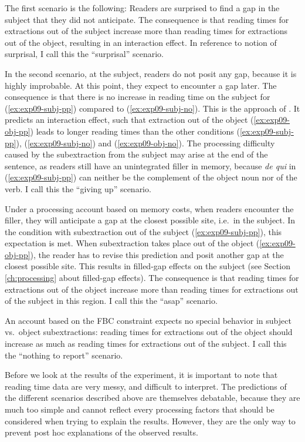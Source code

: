 The first scenario is the following: Readers are surprised to find a gap in the subject that they did not anticipate. The consequence is that reading times for extractions out of the subject increase more than reading times for extractions out of the object, resulting in an interaction effect. In reference to  notion of surprisal, I call this the ``surprisal'' scenario.

In the second scenario, at the subject, readers do not posit any gap, because it is highly improbable. At this point, they expect to encounter a gap later. The consequence is that there is no increase in reading time on the subject for (\ref{ex:exp09-subj-pp}) compared to (\ref{ex:exp09-subj-no}). This is the approach of \citet{Yoshida.2014}. It predicts an interaction effect, such that extraction out of the object (\ref{ex:exp09-obj-pp}) leads to longer reading times than the other conditions (\ref{ex:exp09-subj-pp}), (\ref{ex:exp09-subj-no}) and (\ref{ex:exp09-obj-no}). The processing difficulty caused by the subextraction from the subject may arise at the end of the sentence, as readers still have an unintegrated filler in memory, because \emph{de qui} in (\ref{ex:exp09-subj-pp}) can neither be the complement of the object noun nor of the verb. I call this the ``giving up'' scenario. 

Under a processing account based on memory costs, when readers encounter the filler, they will anticipate a gap at the closest possible site, i.e.\ in the subject. In the condition with subextraction out of the subject (\ref{ex:exp09-subj-pp}), this expectation is met. When subextraction takes place out of the object (\ref{ex:exp09-obj-pp}), the reader has to revise this prediction and posit another gap at the closest possible site. This results in filled-gap effects on the subject (see Section \ref{ch:processing} about filled-gap effects). The consequence is that reading times for extractions out of the object increase more than reading times for extractions out of the subject in this region. I call this the ``asap'' scenario. 

An account based on the FBC constraint expects no special behavior in subject vs.\ object subextractions: reading times for extractions out of the object should increase as much as reading times for extractions out of the subject. I call this the ``nothing to report'' scenario.

Before we look at the results of the experiment, it is important to note that reading time data are very messy, and difficult to interpret. The predictions of the different scenarios described above are themselves debatable, because they are much too simple and cannot reflect every processing factors that should be considered when trying to explain the results. However, they are the only way to prevent post hoc explanations of the observed results.

